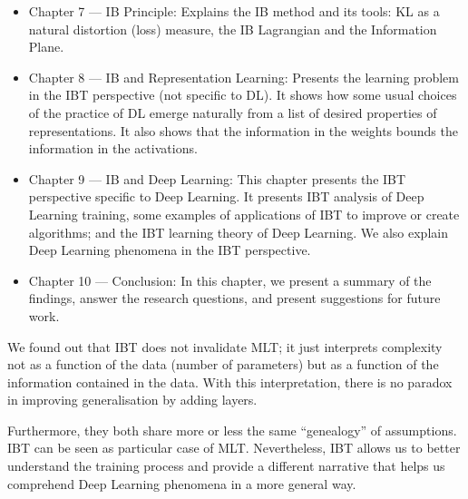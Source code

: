 \documentclass[
  letterpaper,
]{tufte-book}
\begin{document}
\begin{enumerate}
  \begin{itemize}
  \item
    Chapter 7 --- IB Principle: Explains the IB method and its tools:
    {KL} as a natural distortion (loss) measure, the IB Lagrangian and
    the Information Plane.
  \item
    Chapter 8 --- IB and Representation Learning: Presents the learning
    problem in the {IBT} perspective (not specific to {DL}). It shows
    how some usual choices of the practice of {DL} emerge naturally from
    a list of desired properties of representations. It also shows that
    the information in the weights bounds the information in the
    activations.
  \item
    Chapter 9 --- IB and Deep Learning: This chapter presents the {IBT}
    perspective specific to Deep Learning. It presents {IBT} analysis of
    Deep Learning training, some examples of applications of {IBT} to
    improve or create algorithms; and the {IBT} learning theory of Deep
    Learning. We also explain Deep Learning phenomena in the {IBT}
    perspective.
  \item
    Chapter 10 --- Conclusion: In this chapter, we present a summary of
    the findings, answer the research questions, and present suggestions
    for future work.
  \end{itemize}
\end{enumerate}

We found out that {IBT} does not invalidate {MLT}; it just interprets
complexity not as a function of the data (number of parameters) but as a
function of the information contained in the data. With this
interpretation, there is no paradox in improving generalisation by
adding layers.

Furthermore, they both share more or less the same ``genealogy'' of
assumptions. {IBT} can be seen as particular case of {MLT}.
Nevertheless, {IBT} allows us to better understand the training process
and provide a different narrative that helps us comprehend Deep Learning
phenomena in a more general way.
\end{document}
